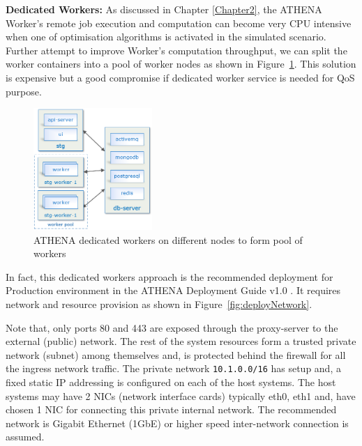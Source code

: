 \noindent \textbf{Dedicated Workers:} \quad As discussed in Chapter \ref{Chapter2}, the ATHENA Worker's remote job execution and computation can become very CPU intensive when one of optimisation algorithms is activated in the simulated scenario. Further attempt to improve Worker's computation throughput, we can split the worker containers into a pool of worker nodes as shown in Figure~\ref{fig:dedicatedWorkers}. This solution is expensive but a good compromise if dedicated worker service is needed for QoS purpose.

\begin{figure}[H]
\centering
\includegraphics[width=0.4\textwidth]{Figures/ATHENA_dedicated_workers}
\decoRule
\caption[ATHENA Dedicated Workers]{ATHENA dedicated workers on different nodes to form pool of workers}
\label{fig:dedicatedWorkers}
\end{figure}

In fact, this dedicated workers approach is the recommended deployment for Production environment in the ATHENA Deployment Guide v1.0 \parencite{athenaAllDoc}. It requires network and resource provision as shown in Figure~\ref{fig:deployNetwork}. 

Note that, only ports 80 and 443 are exposed through the proxy-server to the external (public) network. The rest of the system resources form a trusted private network (subnet) among themselves and, is protected behind the firewall for all the ingress network traffic. The private network \verb|10.1.0.0/16| has setup and, a fixed static IP addressing is configured on each of the host systems. The host systems may have 2 NICs (network interface cards) typically eth0, eth1 and, have chosen 1 NIC for connecting this private internal network. The recommended network is Gigabit Ethernet (1GbE) or higher speed inter-network connection is assumed.

